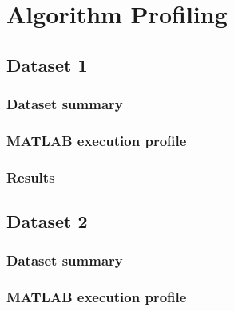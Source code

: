\appendix

\chapter{Algorithm Profiling}
\label{apdx:algorithmProfiling}

\section{Dataset 1}


\subsection{Dataset summary}

\subsection{MATLAB execution profile}

\subsection{Results}

\section{Dataset 2}


\subsection{Dataset summary}

\subsection{MATLAB execution profile}

